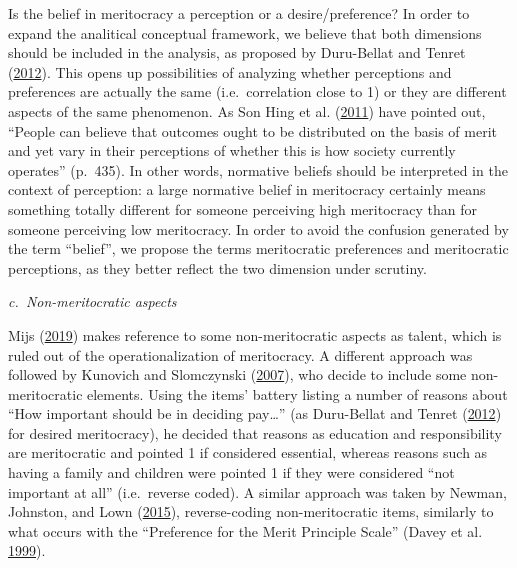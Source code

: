 \documentclass[
]{article}
\begin{document}
Is the belief in meritocracy a perception or a desire/preference? In
order to expand the analitical conceptual framework, we believe that
both dimensions should be included in the analysis, as proposed by
Duru-Bellat and Tenret
(\protect\hyperlink{ref-duru-bellat_whos_2012}{2012}). This opens up
possibilities of analyzing whether perceptions and preferences are
actually the same (i.e.~correlation close to 1) or they are different
aspects of the same phenomenon. As Son Hing et al.
(\protect\hyperlink{ref-son_hing_merit_2011-1}{2011}) have pointed out,
``People can believe that outcomes ought to be distributed on the basis
of merit and yet vary in their perceptions of whether this is how
society currently operates'' (p.~435). In other words, normative beliefs
should be interpreted in the context of perception: a large normative
belief in meritocracy certainly means something totally different for
someone perceiving high meritocracy than for someone perceiving low
meritocracy. In order to avoid the confusion generated by the term
``belief'', we propose the terms meritocratic preferences and
meritocratic perceptions, as they better reflect the two dimension under
scrutiny.

\emph{c.~Non-meritocratic aspects}

Mijs (\protect\hyperlink{ref-mijs_paradox_2019}{2019}) makes reference
to some non-meritocratic aspects as talent, which is ruled out of the
operationalization of meritocracy. A different approach was followed by
Kunovich and Slomczynski
(\protect\hyperlink{ref-kunovich_systems_2007}{2007}), who decide to
include some non-meritocratic elements. Using the items' battery listing
a number of reasons about ``How important should be in deciding
pay\ldots{}'' (as Duru-Bellat and Tenret
(\protect\hyperlink{ref-duru-bellat_whos_2012}{2012}) for desired
meritocracy), he decided that reasons as education and responsibility
are meritocratic and pointed 1 if considered essential, whereas reasons
such as having a family and children were pointed 1 if they were
considered ``not important at all'' (i.e.~reverse coded). A similar
approach was taken by Newman, Johnston, and Lown
(\protect\hyperlink{ref-newman_false_2015}{2015}), reverse-coding
non-meritocratic items, similarly to what occurs with the ``Preference
for the Merit Principle Scale'' (Davey et al.
\protect\hyperlink{ref-davey_preference_1999}{1999}).
\end{document}
